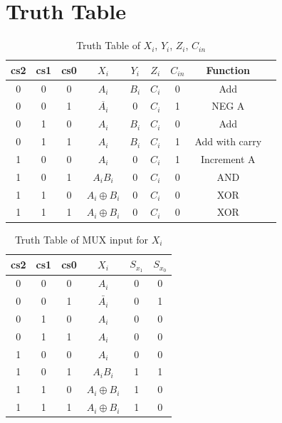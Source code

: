 \documentclass{article}
\begin{document}



\section{\large{Truth Table}}

\begin{table}[H]
	\centering
	\begin{tabular}{|c|c|c|c|c|c|c|c|c|}
		\hline
		cs2 & cs1 & cs0 & $X_{i}$ & $Y_i$ & $Z_{i}$ & $C_{in}$ & Function  \\
		\hline
		0 & 0 & 0 & $A_{i}$ & $B_{i}$ & $C_{i}$ & 0 & Add \\
		0 & 0 & 1 & $\overline{A_i}$ & 0 & $C_i$ & 1 & NEG A \\
		0 & 1 & 0 & $A_{i}$ & $B_{i}$ & $C_{i}$ & 0 & Add \\
		0 & 1 & 1 & $A_{i}$ & $B_{i}$ & $C_{i}$ & 1 & Add with carry \\
		1 & 0 & 0 & $A_i$ & 0 & $C_i$ & 1 & Increment A \\
		1 & 0 & 1 & $A_{i}B_{i}$ & 0 & $C_i$ & 0 & AND \\
		1 & 1 & 0 & $A_i \oplus B_i$ & 0 & $C_i$ & 0 & XOR \\
		1 & 1 & 1 & $A_i \oplus B_i$ & 0 & $C_i$ & 0 & XOR \\
		\hline
	\end{tabular}
	\caption{Truth Table of $X_i$, $Y_i$, $Z_i$, $C_{in}$}
	\label{tab:truth_table1}
\end{table}
\begin{table}[H]
	\centering
	\begin{tabular}{|c|c|c|c|c|c|}
		\hline
		cs2 & cs1 & cs0 & $X_{i}$ & $S_{x_1}$ & $S_{x_0}$  \\
		\hline
		0 & 0 & 0 & $A_{i}$ & 0 & 0 \\
		0 & 0 & 1 & $\bar{A_i}$ & 0 & 1 \\
		0 & 1 & 0 & $A_{i}$ & 0 & 0 \\
		0 & 1 & 1 & $A_{i}$ & 0 & 0 \\
		1 & 0 & 0 & $A_i$ & 0 & 0\\
		1 & 0 & 1 & $A_{i}B_{i}$ & 1 & 1\\
		1 & 1 & 0 & $A_i \oplus B_i$ & 1 & 0 \\
		1 & 1 & 1 & $A_i \oplus B_i$ & 1 & 0 \\
		\hline
	\end{tabular}
	\caption{Truth Table of MUX input for $X_i$}
	\label{tab:truth_table2}
\end{table}
\end{document}
